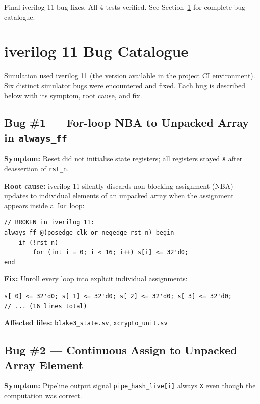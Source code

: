 \documentclass[11pt,a4paper]{article}
\begin{document}
\begin{commitbox}
Final iverilog 11 bug fixes. All 4 tests verified.
See Section~\ref{sec:bugs} for complete bug catalogue.
\end{commitbox}

\section{iverilog 11 Bug Catalogue}
\label{sec:bugs}

Simulation used iverilog 11 (the version available in the project CI
environment). Six distinct simulator bugs were encountered and fixed.
Each bug is described below with its symptom, root cause, and fix.

\subsection{Bug \#1 --- For-loop NBA to Unpacked Array in \texttt{always\_ff}}

\textbf{Symptom:} Reset did not initialise state registers;
all registers stayed \texttt{X} after deassertion of \texttt{rst\_n}.

\textbf{Root cause:} iverilog 11 silently discards non-blocking assignment
(NBA) updates to individual elements of an unpacked array when the
assignment appears inside a \texttt{for} loop:
\begin{lstlisting}
// BROKEN in iverilog 11:
always_ff @(posedge clk or negedge rst_n) begin
    if (!rst_n)
        for (int i = 0; i < 16; i++) s[i] <= 32'd0;
end
\end{lstlisting}

\textbf{Fix:} Unroll every loop into explicit individual assignments:
\begin{lstlisting}
s[ 0] <= 32'd0; s[ 1] <= 32'd0; s[ 2] <= 32'd0; s[ 3] <= 32'd0;
// ... (16 lines total)
\end{lstlisting}

\textbf{Affected files:} \texttt{blake3\_state.sv}, \texttt{xcrypto\_unit.sv}

\subsection{Bug \#2 --- Continuous Assign to Unpacked Array Element}

\textbf{Symptom:} Pipeline output signal \texttt{pipe\_hash\_live[i]} always \texttt{X}
even though the computation was correct.
\end{document}
